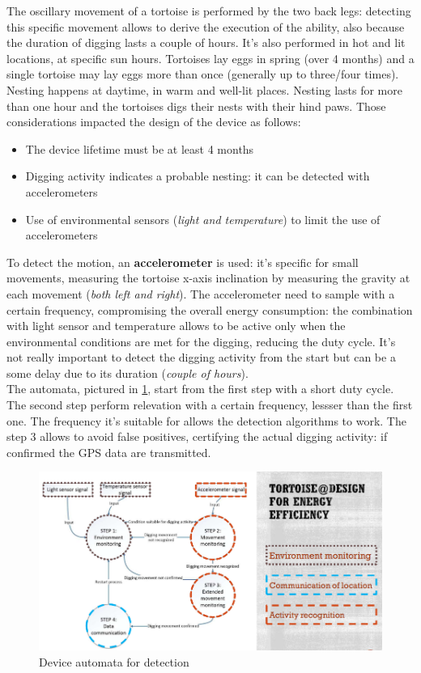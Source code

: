 \documentclass[10pt,a4paper]{report}
\theoremstyle{definition}
\begin{document}
The oscillary movement of a tortoise is performed by the two back legs: detecting this specific movement allows to derive the execution of the ability, also because the duration of digging lasts a couple of hours. It's also performed in hot and lit locations, at specific sun hours.
Tortoises lay eggs in spring (over 4 months) and a single tortoise may lay eggs more than once (generally up to three/four times). Nesting happens at daytime, in warm and well-lit places. Nesting lasts for more than one hour and the tortoises digs their nests with their hind paws.
Those considerations impacted the design of the device as follows:
\begin{itemize}
	\item 
	The device lifetime must be at least 4 months
	\item 
	Digging activity indicates a probable nesting: it can be detected with accelerometers
	\item 
	Use of environmental sensors (\textit{light and temperature}) to limit the use of accelerometers
	
\end{itemize}
To detect the motion, an \textbf{accelerometer} is used: it's specific for small movements, measuring the tortoise x-axis inclination by measuring the gravity at each movement (\textit{both left and right}). The accelerometer need to sample with a certain frequency, compromising the overall energy consumption: the combination with light sensor and temperature allows to be active only when the environmental conditions are met for the digging, reducing the duty cycle. It's not really important to detect the digging activity from the start but can be a some delay due to its duration (\textit{couple of hours}).\\

The automata, pictured in \ref{tortoise-automata}, start from the first step with a short duty cycle. The second step perform relevation with a certain frequency, lessser than the first one. The frequency it's suitable for allows the detection algorithms to work. The step 3 allows to avoid false positives, certifying the actual digging activity: if confirmed the GPS data are transmitted.

\begin{figure}
	\centering\includegraphics[scale=0.50]{images/Pasted image 20230331164027.png}
	\caption{Device automata for detection}
	\label{tortoise-automata}
\end{figure}
\end{document}
